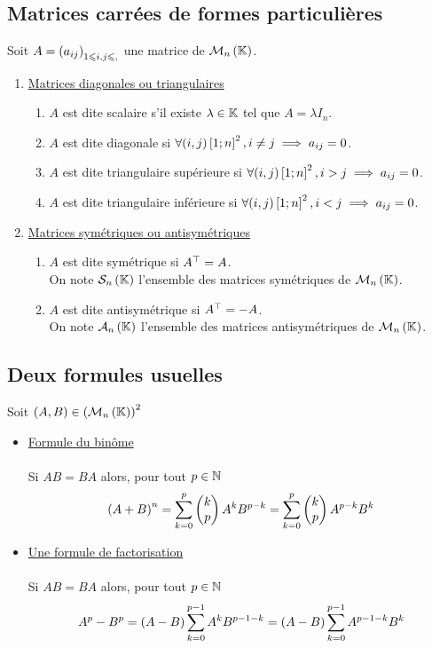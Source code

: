 \subsection{Matrices carrées de formes particulières}
\begin{defprop}
    Soit \(A =  \paren{a_{ij}}_{1\leq i,j \leq ,}\) une matrice de \(\mathcal{M}_n\paren{\K}\).
    \begin{enumerate}
        \item \underline{Matrices diagonales ou triangulaires}
        \begin{enumerate}
            \item \(A\) est dite scalaire s’il existe \( \lambda \in \K\) tel que \(A = \lambda I_n\).
            \item \(A\) est dite diagonale si \(\forall(i, j) \intervii{1}{n}^2 , i\neq j \imp a_{ij} = 0\).
            \item \(A\) est dite triangulaire supérieure si \(\forall(i, j) \intervii{1}{n}^2 , i > j \imp a_{ij} = 0\).
            \item \(A\) est dite triangulaire inférieure si \(\forall(i, j) \intervii{1}{n}^2 , i < j \imp a_{ij} = 0\).
        \end{enumerate}
        \item \underline{Matrices symétriques ou antisymétriques}
        \begin{enumerate}
            \item \(A\) est dite symétrique si \( \trans{A} = A\). \\
            On note \(\mathcal{S}_n \paren{\K}\) l’ensemble des matrices symétriques de \(\mathcal{M}_n\paren{\K}\).
            \item \(A\) est dite antisymétrique si \(\trans{A} = -A\). \\
            On note \(\mathcal{A}_n \paren{\K}\) l’ensemble des matrices antisymétriques de \(\mathcal{M}_n\paren{\K}\). 
        \end{enumerate}
    \end{enumerate}
\end{defprop}

\subsection{Deux formules usuelles}
Soit \(\paren{A,B} \in \paren{\mathcal{M}_n\paren{\K}}^2\)
\begin{itemize}
    \item \underline{Formule du binôme}\\~\\
        Si \(AB = BA\) alors, pour tout \(p \in \N\)
        \[\paren{A +B }^n = \sum_{k=0}^p \binom{p}{k}A^k B^{p-k}=\sum_{k=0}^p \binom{p}{k}A^{p-k} B^{k}\]
    \item \underline{Une formule de factorisation}\\~\\
        Si \(AB = BA\) alors, pour tout \(p \in \N\)
        \[A^p - B^p = \paren{A-B}\sum_{k=0}^{p-1} A^k B^{p-1-k} = \paren{A-B}\sum_{k=0}^{p-1} A^{p-1-k} B^{k}\]
\end{itemize}

